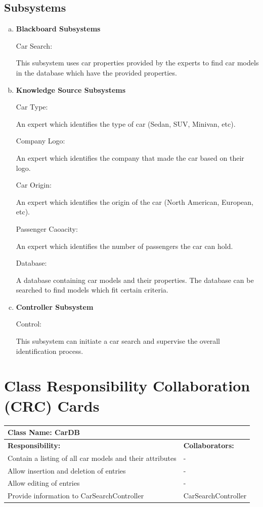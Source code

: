 \documentclass[12pt]{article}
\begin{document}
\subsection{Subsystems}
\label{sub:subsystems}
\begin{enumerate}[a)]
	\item {\textbf{Blackboard Subsystems}}
	\par Car Search:
	\par This subsystem uses car properties provided by the experts to find car models in the database which have the provided properties.
	\item {\textbf{Knowledge Source Subsystems}}
	\par Car Type:
	\par An expert which identifies the type of car (Sedan, SUV, Minivan, etc).
	\par Company Logo:
	\par An expert which identifies the company that made the car based on their logo.
	\par Car Origin:
	\par An expert which identifies the origin of the car (North American, European, etc).
	\par Passenger Caoacity:
	\par An expert which identifies the number of passengers the car can hold.
	\par Database:
	\par A database containing car models and their properties. The database can be searched to find models which fit certain criteria.
	\item {\textbf{Controller Subsystem}}
	\par Control:
	\par This subsystem can initiate a car search and supervise the overall identification process.
\end{enumerate}

	
\section{Class Responsibility Collaboration (CRC) Cards}
\label{sec:class_responsibility_collaboration_crc_cards}

	\begin{table}[ht]
		\centering
		\begin{tabular}{|p{5cm}|p{5cm}|}
		\hline 
		 \multicolumn{2}{|l|}{\textbf{Class Name:} CarDB} \\
		\hline
		\textbf{Responsibility:} & \textbf{Collaborators:} \\
		\hline
		Contain a listing of all car models and their attributes & -\\
		\hline
		Allow insertion and deletion of entries & -\\
		\hline
		Allow editing of entries & - \\
		\hline
		Provide information to CarSearchController & CarSearchController \\
		\hline
		\end{tabular}
	\end{table}
	
\end{document}
